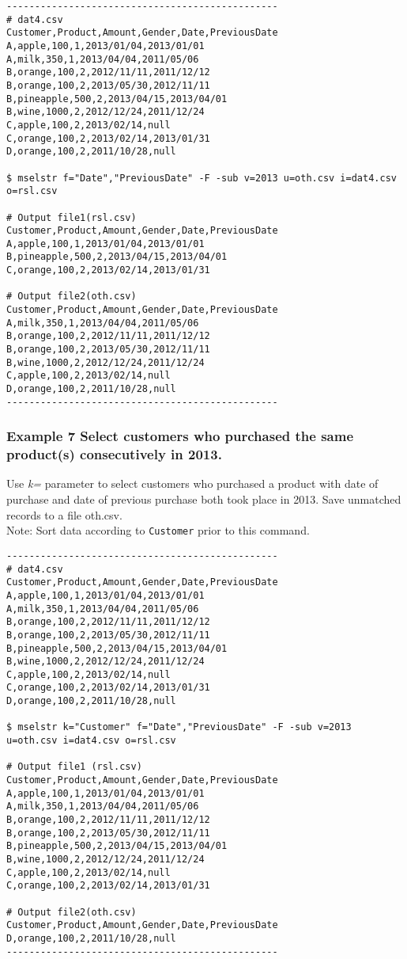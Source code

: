 \documentclass[a4paper]{jarticle}
\begin{document}
\begin{verbatim}
------------------------------------------------
# dat4.csv
Customer,Product,Amount,Gender,Date,PreviousDate
A,apple,100,1,2013/01/04,2013/01/01
A,milk,350,1,2013/04/04,2011/05/06
B,orange,100,2,2012/11/11,2011/12/12
B,orange,100,2,2013/05/30,2012/11/11
B,pineapple,500,2,2013/04/15,2013/04/01
B,wine,1000,2,2012/12/24,2011/12/24
C,apple,100,2,2013/02/14,null
C,orange,100,2,2013/02/14,2013/01/31
D,orange,100,2,2011/10/28,null

$ mselstr f="Date","PreviousDate" -F -sub v=2013 u=oth.csv i=dat4.csv o=rsl.csv

# Output file1(rsl.csv)
Customer,Product,Amount,Gender,Date,PreviousDate
A,apple,100,1,2013/01/04,2013/01/01
B,pineapple,500,2,2013/04/15,2013/04/01
C,orange,100,2,2013/02/14,2013/01/31

# Output file2(oth.csv)
Customer,Product,Amount,Gender,Date,PreviousDate
A,milk,350,1,2013/04/04,2011/05/06
B,orange,100,2,2012/11/11,2011/12/12
B,orange,100,2,2013/05/30,2012/11/11
B,wine,1000,2,2012/12/24,2011/12/24
C,apple,100,2,2013/02/14,null
D,orange,100,2,2011/10/28,null
------------------------------------------------
\end{verbatim}

\subsubsection*{Example 7 Select customers who purchased the same product(s) consecutively in 2013. }
Use \emph{k=} parameter to select customers who purchased a product with date of purchase and date of previous purchase both took place in 2013. Save unmatched records to a file oth.csv. \\ 
Note: Sort data according to \verb|Customer| prior to this command. 

\begin{verbatim}
------------------------------------------------
# dat4.csv
Customer,Product,Amount,Gender,Date,PreviousDate
A,apple,100,1,2013/01/04,2013/01/01
A,milk,350,1,2013/04/04,2011/05/06
B,orange,100,2,2012/11/11,2011/12/12
B,orange,100,2,2013/05/30,2012/11/11
B,pineapple,500,2,2013/04/15,2013/04/01
B,wine,1000,2,2012/12/24,2011/12/24
C,apple,100,2,2013/02/14,null
C,orange,100,2,2013/02/14,2013/01/31
D,orange,100,2,2011/10/28,null

$ mselstr k="Customer" f="Date","PreviousDate" -F -sub v=2013 u=oth.csv i=dat4.csv o=rsl.csv

# Output file1 (rsl.csv)
Customer,Product,Amount,Gender,Date,PreviousDate
A,apple,100,1,2013/01/04,2013/01/01
A,milk,350,1,2013/04/04,2011/05/06
B,orange,100,2,2012/11/11,2011/12/12
B,orange,100,2,2013/05/30,2012/11/11
B,pineapple,500,2,2013/04/15,2013/04/01
B,wine,1000,2,2012/12/24,2011/12/24
C,apple,100,2,2013/02/14,null
C,orange,100,2,2013/02/14,2013/01/31

# Output file2(oth.csv)
Customer,Product,Amount,Gender,Date,PreviousDate
D,orange,100,2,2011/10/28,null
------------------------------------------------
\end{verbatim}
\end{document}
